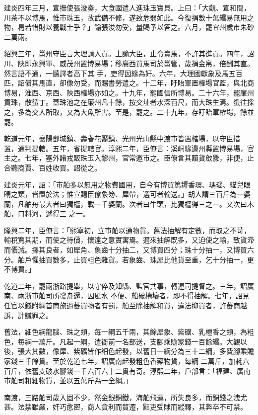 \begin{pinyinscope}
 建炎四年三月，宣撫使張浚奏，大食國遣人進珠玉寶貝。上曰：「大觀、宣和間，川茶不以博馬，惟市珠玉，故武備不修，遂致危弱如此。今復捐數十萬緡易無用之物，曷若惜財以養戰士乎？」諭張浚勿受，量賜予以答之。六月，罷宜州歲市朱砂二萬兩。



 紹興三年，邕州守臣言大理請入貢。上諭大臣，止令賣馬，不許其進貢。四年，詔川、陜即永興軍、威茂州置博易場；移廣西買馬司於邕管，歲捐金帛，倍酬其直。然言語不通，一聽譯者高下其
 手，吏得因緣為奸。六年，大理國獻象及馬五百匹，詔償其馬直，卻像勿受，而賜書勞遣之。十二年，盱眙軍置榷場官監，與北商博易，淮西、京西、陜西榷場亦如之。十九年，罷國信所博易。二十六年，罷廉州貢珠，散蜑丁。蓋珠池之在廉州凡十餘，按交址者水深百尺，而大珠生焉。蜑往採之，多為交人所取，又為大魚所害。至是，罷之。二十九年，存盱眙軍榷場，餘並罷。



 乾道元年，襄陽鄧城鎮、壽春花靨鎮、光州光山縣中渡市皆置榷場，以守臣措
 置，通判提轄。五年，省提轄官。淳熙二年，臣僚言：溪峒緣邊州縣置博易場，官主之。七年，塞外諸戎販珠玉入黎州，官常邀市之。臣僚言其黷貨啟釁，非便，止合聽商賈、百姓收買。詔從之。



 建炎元年，詔：「市舶多以無用之物費國用，自今有博買篤耨香環、瑪瑙、貓兒眼睛之類，皆置於法；惟宣賜臣僚象笏、犀帶，選可者輸送。」胡人謂三百斤為一婆蘭，凡舶舟最大者曰獨檣，載一千婆蘭。次者曰牛頭，比獨檣得三之一。又次曰木舶，曰料河，遞得三
 之一。



 隆興二年，臣僚言：「熙寧初，立市舶以通物貨。舊法抽解有定數，而取之不苛，輸稅寬其期，而使之待價，懷遠之意實寓焉。邇來抽解既多，又迫使之輸，致貨滯而價減。擇其良者，如犀角、象齒十分抽二，又博買四分；珠十分抽一，又博買六分。舶戶懼抽買數多，止買粗色雜貨。若象齒、珠犀比他貨至重，乞十分抽一，更不博買。」



 乾道二年，罷兩浙路提舉，以守倅及知縣、監官共事，轉運司提督之。三年，詔廣南、兩浙市舶司所發舟還，因風水
 不便、船破檣壞者，即不得抽解。七年，詔見任官以錢附綱首商旅過蕃買物者有罰，舶至除抽解和買，違法抑買者，許蕃商越訴，計贓罪之。



 舊法，細色綱龍腦、珠之類，每一綱五千兩，其餘犀象、紫礦、乳檀香之類，為粗色，每綱一萬斤。凡起一綱，遣衙前一名部送，支腳乘贍家錢一百餘緡。大觀以後，張大其數，像犀、紫礦皆作細色起發，以舊日一綱分為三十二綱，多費腳乘贍家錢三千餘貫。至於乾道七年，詔廣南起發粗色香藥物貨，每綱
 二萬斤，加耗六百斤，依舊支破水腳錢一千六百六十二貫有奇。淳熙二年，戶部言：「福建、廣南市舶司粗細物貨，並以五萬斤為一全綱。」



 南渡，三路舶司歲入固不少，然金銀銅鐵，海舶飛運，所失良多，而銅錢之洩尤甚。法禁雖嚴，奸巧愈密，商人貪利而貿遷，黠吏受賕而縱釋，其弊卒不可禁。



\end{pinyinscope}